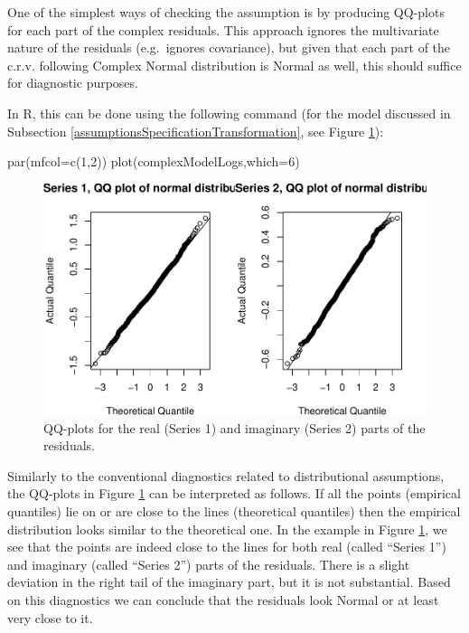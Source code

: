 \documentclass[
]{book}
\newenvironment{Shaded}{\begin{snugshade}}{\end{snugshade}}
\newcommand{\AttributeTok}[1]{\textcolor[rgb]{0.77,0.63,0.00}{#1}}
\newcommand{\DecValTok}[1]{\textcolor[rgb]{0.00,0.00,0.81}{#1}}
\newcommand{\FunctionTok}[1]{\textcolor[rgb]{0.00,0.00,0.00}{#1}}
\newcommand{\NormalTok}[1]{#1}
\begin{document}
One of the simplest ways of checking the assumption is by producing QQ-plots for each part of the complex residuals. This approach ignores the multivariate nature of the residuals (e.g.~ignores covariance), but given that each part of the c.r.v. following Complex Normal distribution is Normal as well, this should suffice for diagnostic purposes.

In R, this can be done using the following command (for the model discussed in Subsection \ref{assumptionsSpecificationTransformation}, see Figure \ref{fig:complexNormDiagnostics}):

\begin{Shaded}
\begin{Highlighting}[]
\FunctionTok{par}\NormalTok{(}\AttributeTok{mfcol=}\FunctionTok{c}\NormalTok{(}\DecValTok{1}\NormalTok{,}\DecValTok{2}\NormalTok{))}
\FunctionTok{plot}\NormalTok{(complexModelLogs,}\AttributeTok{which=}\DecValTok{6}\NormalTok{)}
\end{Highlighting}
\end{Shaded}

\begin{figure}
\centering
\includegraphics{Svetunkov---Svetunkov---Complex-Valued-Econometrics_files/figure-latex/complexNormDiagnostics-1.pdf}
\caption{\label{fig:complexNormDiagnostics}QQ-plots for the real (Series 1) and imaginary (Series 2) parts of the residuals.}
\end{figure}

Similarly to the conventional diagnostics related to distributional assumptions, the QQ-plots in Figure \ref{fig:complexNormDiagnostics} can be interpreted as follows. If all the points (empirical quantiles) lie on or are close to the lines (theoretical quantiles) then the empirical distribution looks similar to the theoretical one. In the example in Figure \ref{fig:complexNormDiagnostics}, we see that the points are indeed close to the lines for both real (called ``Series 1'') and imaginary (called ``Series 2'') parts of the residuals. There is a slight deviation in the right tail of the imaginary part, but it is not substantial. Based on this diagnostics we can conclude that the residuals look Normal or at least very close to it.
\end{document}
